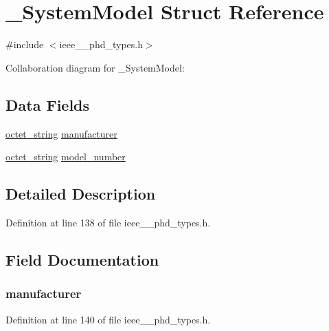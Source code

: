 \hypertarget{struct___system_model}{}\section{\+\_\+\+System\+Model Struct Reference}
\label{struct___system_model}


{\ttfamily \#include $<$ieee\+\_\+\_\+phd\+\_\+types.\+h$>$}



Collaboration diagram for \+\_\+\+System\+Model\+:
\subsection*{Data Fields}
\begin{DoxyCompactItemize}
\item 
\hyperlink{ieee__11073__phd__types_8h_a5524261dd425fc0bd90c9d87277b7127}{octet\+\_\+string} \hyperlink{struct___system_model_ad0512de7c39e521e9c0f8cf4173c89c2}{manufacturer}
\item 
\hyperlink{ieee__11073__phd__types_8h_a5524261dd425fc0bd90c9d87277b7127}{octet\+\_\+string} \hyperlink{struct___system_model_a1a8673ffb1117d2d8848877ba48119b9}{model\+\_\+number}
\end{DoxyCompactItemize}


\subsection{Detailed Description}


Definition at line 138 of file ieee\+\_\+\_\+phd\+\_\+types.\+h.



\subsection{Field Documentation}
\hypertarget{struct___system_model_ad0512de7c39e521e9c0f8cf4173c89c2}{}
\subsubsection[{manufacturer}]{ manufacturer}\label{struct___system_model_ad0512de7c39e521e9c0f8cf4173c89c2}


Definition at line 140 of file ieee\+\_\+\_\+phd\+\_\+types.\+h.

